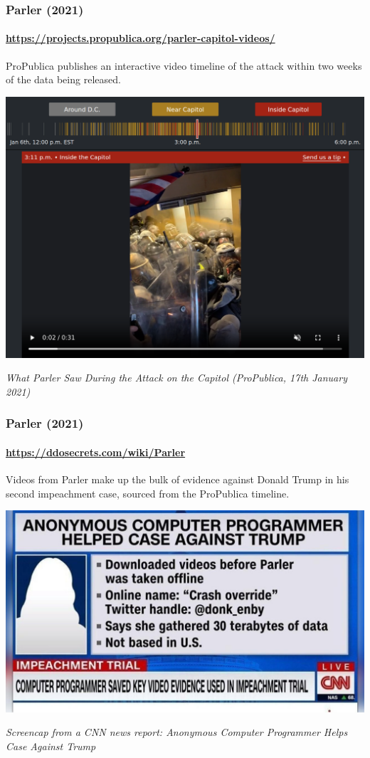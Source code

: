 \documentclass[aspectratio=169,usenames,dvipsnames]{beamer}
\begin{document}
\begin{frame}
  \frametitle{Parler (2021)}
  \framesubtitle{\url{https://projects.propublica.org/parler-capitol-videos/}}

  \footnotesize
  ProPublica publishes an interactive video timeline of the attack within two
  weeks of the data being released.

  \centering \vfill
  \includegraphics[width=\textwidth,height=0.6\textheight,keepaspectratio]{img/parler_propublica.png}

  \emph{What Parler Saw During the Attack on the Capitol (ProPublica, 17th
  January 2021)}

\end{frame}

\begin{frame}
  \frametitle{Parler (2021)}
  \framesubtitle{\url{https://ddosecrets.com/wiki/Parler}}

  \footnotesize
  Videos from Parler make up the bulk of evidence against Donald Trump in
  his second impeachment case, sourced from the ProPublica timeline.

  \centering \vfill
  \includegraphics[width=\textwidth,height=0.6\textheight,keepaspectratio]{img/parler_cnn.png}

  \emph{Screencap from a CNN news report: Anonymous Computer Programmer Helps
  Case Against Trump}

\end{frame}
\end{document}

